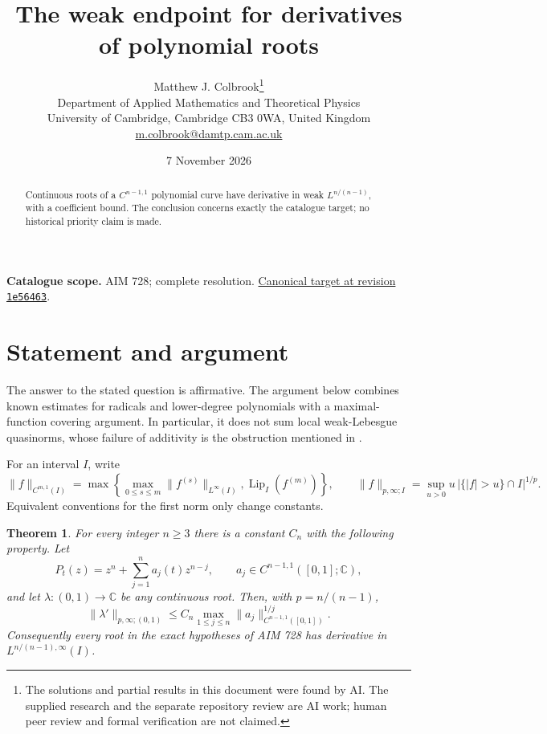 \documentclass[11pt,a4paper]{article}
\newtheorem{theorem}{Theorem}[section]
\theoremstyle{remark}
\begin{document}
\title{The weak endpoint for derivatives of polynomial roots}
\author{Matthew J. Colbrook\thanks{The solutions and partial results in this document were found by AI. The supplied research and the separate repository review are AI work; human peer review and formal verification are not claimed.}\\[4pt]
\small Department of Applied Mathematics and Theoretical Physics\\
\small University of Cambridge, Cambridge CB3 0WA, United Kingdom\\
\small\href{mailto:m.colbrook@damtp.cam.ac.uk}{m.colbrook@damtp.cam.ac.uk}}
\date{7 November 2026}
\maketitle
\begin{abstract}
Continuous roots of a $C^{n-1,1}$ polynomial curve have derivative in weak $L^{n/(n-1)}$, with a coefficient bound. The conclusion concerns exactly the catalogue target; no historical priority claim is made.
\end{abstract}
\noindent\textbf{Catalogue scope.} AIM 728; complete resolution. \href{https://github.com/MColbrook/AIM/blob/1e564633494c109edfd3ec46da1366adcff925a5/problems/728-do-continuous-polynomial-roots-have-weak-endpoint-derivative-regularity.md}{Canonical target at revision \texttt{1e56463}}.


\section{Statement and argument}
\label{sec:728}

The answer to the stated question is affirmative.  The argument below combines
known estimates for radicals and lower-degree polynomials with a maximal-function
covering argument.  In particular, it does not sum local weak-Lebesgue
quasinorms, whose failure of additivity is the obstruction mentioned in
\cite[Open Problem 2]{ParusinskiRainer}.

For an interval $I$, write
\[
 \|f\|_{C^{m,1}(I)}
 =\max\left\{\max_{0\le s\le m}\|f^{(s)}\|_{L^\infty(I)},
                 \operatorname{Lip}_I(f^{(m)})\right\},
 \qquad
 \|f\|_{p,\infty;I}
 =\sup_{u>0}u\,|\{|f|>u\}\cap I|^{1/p}.
\]
Equivalent conventions for the first norm only change constants.

\begin{theorem}
\label{thm:728}
For every integer $n\ge3$ there is a constant $C_n$ with the following
property.  Let
\[
 P_t(z)=z^n+\sum_{j=1}^n a_j(t)z^{n-j},\qquad
 a_j\in C^{n-1,1}([0,1];\mathbb C),
\]
and let $\lambda:(0,1)\to\mathbb C$ be any continuous root.  Then, with
$p=n/(n-1)$,
\[
 \|\lambda'\|_{p,\infty;(0,1)}
 \le C_n\max_{1\le j\le n}
               \|a_j\|_{C^{n-1,1}([0,1])}^{1/j}.
 \tag{728.1}
\]
Consequently every root in the exact hypotheses of AIM 728 has derivative in
$L^{n/(n-1),\infty}(I)$.
\end{theorem}
\end{document}
